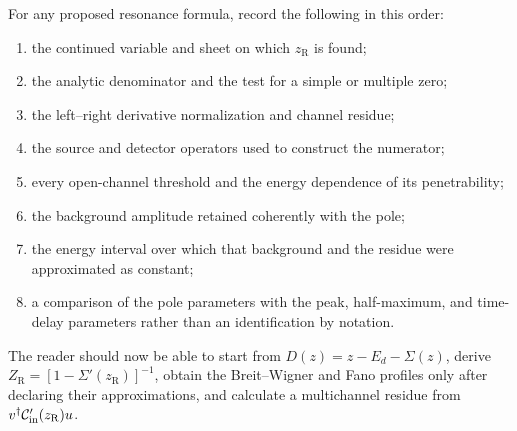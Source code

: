 For any proposed resonance formula, record the following in this order:
\begin{enumerate}[label=\arabic*.]
  \item the continued variable and sheet on which $z_{\mathrm R}$ is found;
  \item the analytic denominator and the test for a simple or multiple zero;
  \item the left--right derivative normalization and channel residue;
  \item the source and detector operators used to construct the numerator;
  \item every open-channel threshold and the energy dependence of its
  penetrability;
  \item the background amplitude retained coherently with the pole;
  \item the energy interval over which that background and the residue were
  approximated as constant;
  \item a comparison of the pole parameters with the peak, half-maximum, and
  time-delay parameters rather than an identification by notation.
\end{enumerate}

\begin{checkpointbox}
The reader should now be able to start from $D(z)=z-E_d-\Sigma(z)$, derive
$Z_{\mathrm R}=[1-\Sigma'(z_{\mathrm R})]^{-1}$, obtain the Breit--Wigner
and Fano profiles only after declaring their approximations, and calculate a
multichannel residue from
$v^\dagger\mathcal{C}_{\mathrm{in}}'(z_{\mathrm R})u$.
\end{checkpointbox}
